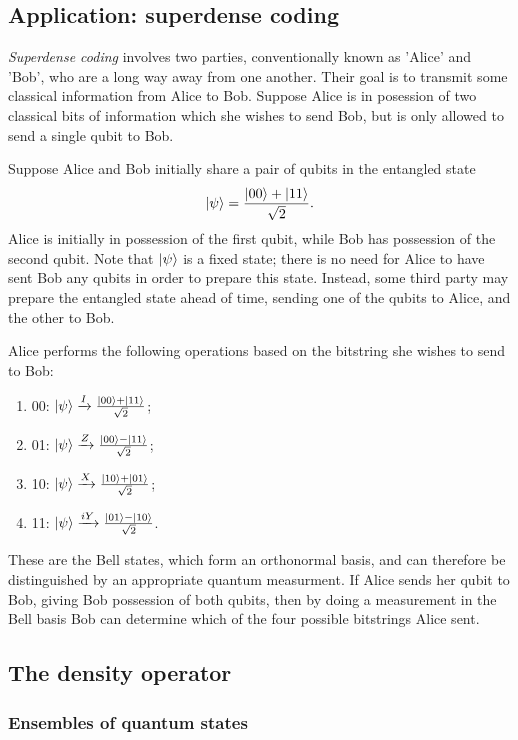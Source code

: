 \documentclass{article}
\numberwithin{theorem}{section}
\numberwithin{corollary}{section}
\numberwithin{postulate}{section}
\begin{document}
\subsection{Application: superdense coding}

\emph{Superdense coding} involves two parties, conventionally known as 'Alice'
and 'Bob', who are a long way away from one another. Their goal is to transmit
some classical information from Alice to Bob. Suppose Alice is in posession of
two classical bits of information which she wishes to send Bob, but is only
allowed to send a single qubit to Bob.

Suppose Alice and Bob initially share a pair of qubits in the entangled state
\[
  \ket{\psi} = \frac{\ket{00} + \ket{11}}{\sqrt{2}}.
\] Alice is initially in possession of the first qubit, while Bob has
possession of the second qubit. Note that $\ket{\psi}$ is a fixed state; there
is no need for Alice to have sent Bob any qubits in order to prepare this
state. Instead, some third party may prepare the entangled state ahead of time,
sending one of the qubits to Alice, and the other to Bob.

Alice performs the following operations based on the bitstring she wishes to
send to Bob:
\begin{enumerate}
  \item 00: $\ket{\psi} \xrightarrow{I} \frac{\ket{00} + \ket{11}}{\sqrt{2}}$;
  \item 01: $\ket{\psi} \xrightarrow{Z} \frac{\ket{00} - \ket{11}}{\sqrt{2}}$;
  \item 10: $\ket{\psi} \xrightarrow{X} \frac{\ket{10} + \ket{01}}{\sqrt{2}}$;
  \item 11: $\ket{\psi} \xrightarrow{iY} \frac{\ket{01} - \ket{10}}{\sqrt{2}}$.
\end{enumerate}
These are the Bell states, which form an orthonormal basis, and can therefore
be distinguished by an appropriate quantum measurment. If Alice sends her qubit
to Bob, giving Bob possession of both qubits, then by doing a measurement in
the Bell basis Bob can determine which of the four possible bitstrings Alice
sent.

\subsection{The density operator}

\subsubsection{Ensembles of quantum states}
\end{document}
